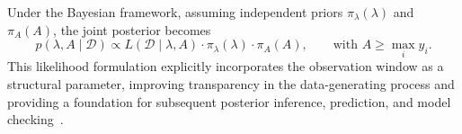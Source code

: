 Under the Bayesian framework, assuming independent priors $\pi_\lambda(\lambda)$ and $\pi_A(A)$, the joint posterior becomes
\begin{equation}
p(\lambda, A \mid \mathcal{D}) \propto 
L(\mathcal{D} \mid \lambda, A)\cdot
\pi_\lambda(\lambda)\cdot
\pi_A(A),
\qquad \text{with } A \ge \max_i y_i.
\label{A_post}
\end{equation}
This likelihood formulation explicitly incorporates the observation window as a structural parameter, improving transparency in the data-generating process and providing a foundation for subsequent posterior inference, prediction, and model checking~\cite{stats5010006}.
